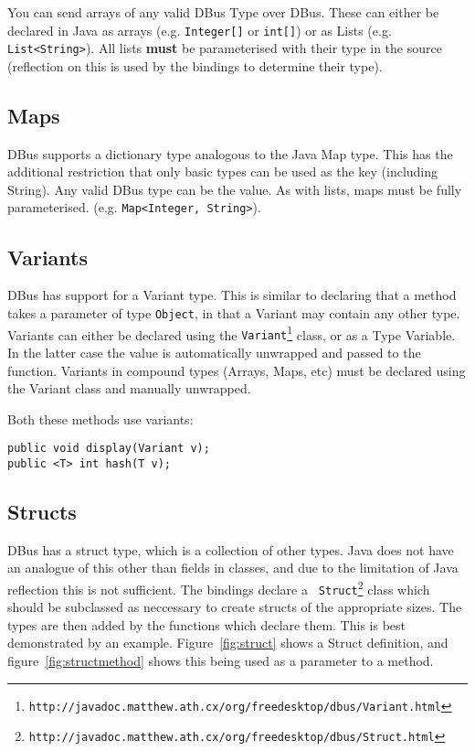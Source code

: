 \documentclass[a4paper,12pt]{article}
\begin{document}
You can send arrays of any valid DBus Type over DBus. These can
either be declared in Java as arrays (e.g. \verb&Integer[]& or
\verb&int[]&) or as Lists (e.g. \verb&List<String>&). All lists {\bf
must} be parameterised with their type in the source (reflection on
this is used by the bindings to determine their type).

\subsection{Maps}

DBus supports a dictionary type analogous to the Java Map type. This
has the additional restriction that only basic types can be used as
the key (including String). Any valid DBus type can be the value. As
with lists, maps must be fully parameterised. (e.g.
\verb&Map<Integer, String>&).

\subsection{Variants}

DBus has support for a Variant type. This is similar to declaring that a method takes a parameter of type {\tt Object}, in that a Variant may contain any other type. Variants can either be declared using the {\tt Variant\footnote{http://javadoc.matthew.ath.cx/org/freedesktop/dbus/Variant.html}} class, or as a Type Variable. In the latter case the value is automatically unwrapped and passed to the function. Variants in compound types (Arrays, Maps, etc) must be declared using the Variant class and manually unwrapped.

Both these methods use variants:

\begin{verbatim}
public void display(Variant v);
public <T> int hash(T v);
\end{verbatim}

\subsection{Structs}

DBus has a struct type, which is a collection of other types. Java
does not have an analogue of this other than fields in classes, and
due to the limitation of Java reflection this is not sufficient. The
bindings declare a {\tt
Struct\footnote{http://javadoc.matthew.ath.cx/org/freedesktop/dbus/Struct.html}} class
which should be subclassed as neccessary to create structs of the
appropriate sizes. The types are then added by the functions which
declare them. This is best demonstrated by an example.
Figure~\ref{fig:struct} shows a Struct definition, and
figure~\ref{fig:structmethod} shows this being used as a parameter
to a method.
\end{document}
